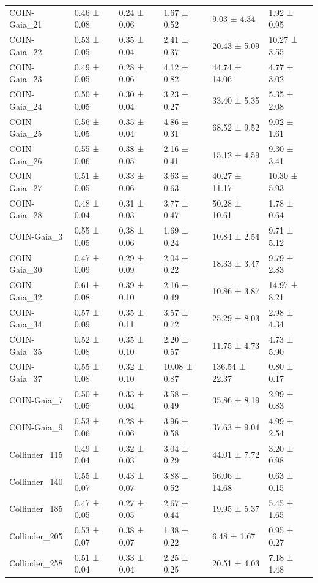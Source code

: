 \begin{tabular}{llllll}
COIN-Gaia_21 & 0.46 ± 0.08 & 0.24 ± 0.06 & 1.67 ± 0.52 & 9.03 ± 4.34 & 1.92 ± 0.95 \\
COIN-Gaia_22 & 0.53 ± 0.05 & 0.35 ± 0.04 & 2.41 ± 0.37 & 20.43 ± 5.09 & 10.27 ± 3.55 \\
COIN-Gaia_23 & 0.49 ± 0.05 & 0.28 ± 0.06 & 4.12 ± 0.82 & 44.74 ± 14.06 & 4.77 ± 3.02 \\
COIN-Gaia_24 & 0.50 ± 0.05 & 0.30 ± 0.04 & 3.23 ± 0.27 & 33.40 ± 5.35 & 5.35 ± 2.08 \\
COIN-Gaia_25 & 0.56 ± 0.05 & 0.35 ± 0.04 & 4.86 ± 0.31 & 68.52 ± 9.52 & 9.02 ± 1.61 \\
COIN-Gaia_26 & 0.55 ± 0.06 & 0.38 ± 0.05 & 2.16 ± 0.41 & 15.12 ± 4.59 & 9.30 ± 3.41 \\
COIN-Gaia_27 & 0.51 ± 0.05 & 0.33 ± 0.06 & 3.63 ± 0.63 & 40.27 ± 11.17 & 10.30 ± 5.93 \\
COIN-Gaia_28 & 0.48 ± 0.04 & 0.31 ± 0.03 & 3.77 ± 0.47 & 50.28 ± 10.61 & 1.78 ± 0.64 \\
COIN-Gaia_3 & 0.55 ± 0.05 & 0.38 ± 0.06 & 1.69 ± 0.24 & 10.84 ± 2.54 & 9.71 ± 5.12 \\
COIN-Gaia_30 & 0.47 ± 0.09 & 0.29 ± 0.09 & 2.04 ± 0.22 & 18.33 ± 3.47 & 9.79 ± 2.83 \\
COIN-Gaia_32 & 0.61 ± 0.08 & 0.39 ± 0.10 & 2.16 ± 0.49 & 10.86 ± 3.87 & 14.97 ± 8.21 \\
COIN-Gaia_34 & 0.57 ± 0.09 & 0.35 ± 0.11 & 3.57 ± 0.72 & 25.29 ± 8.03 & 2.98 ± 4.34 \\
COIN-Gaia_35 & 0.52 ± 0.08 & 0.35 ± 0.10 & 2.20 ± 0.57 & 11.75 ± 4.73 & 4.73 ± 5.90 \\
COIN-Gaia_37 & 0.55 ± 0.08 & 0.32 ± 0.10 & 10.08 ± 0.87 & 136.54 ± 22.37 & 0.80 ± 0.17 \\
COIN-Gaia_7 & 0.50 ± 0.05 & 0.33 ± 0.04 & 3.58 ± 0.49 & 35.86 ± 8.19 & 2.99 ± 0.83 \\
COIN-Gaia_9 & 0.53 ± 0.06 & 0.28 ± 0.06 & 3.96 ± 0.58 & 37.63 ± 9.04 & 4.99 ± 2.54 \\
Collinder_115 & 0.49 ± 0.04 & 0.32 ± 0.03 & 3.04 ± 0.29 & 44.01 ± 7.72 & 3.20 ± 0.98 \\
Collinder_140 & 0.55 ± 0.07 & 0.43 ± 0.07 & 3.88 ± 0.52 & 66.06 ± 14.68 & 0.63 ± 0.15 \\
Collinder_185 & 0.47 ± 0.05 & 0.27 ± 0.05 & 2.67 ± 0.44 & 19.95 ± 5.37 & 5.45 ± 1.65 \\
Collinder_205 & 0.53 ± 0.07 & 0.38 ± 0.07 & 1.38 ± 0.22 & 6.48 ± 1.67 & 0.95 ± 0.27 \\
Collinder_258 & 0.51 ± 0.04 & 0.33 ± 0.04 & 2.25 ± 0.25 & 20.51 ± 4.03 & 7.18 ± 1.48 \\

\end{tabular}

